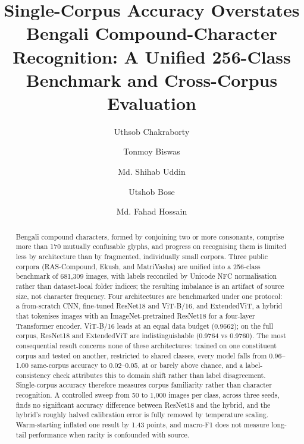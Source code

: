 \documentclass[5p,10pt]{elsarticle}
\begin{document}
\begin{frontmatter}

\title{Single-Corpus Accuracy Overstates Bengali Compound-Character Recognition: A Unified 256-Class Benchmark and Cross-Corpus Evaluation}

\author[inst1]{Uthsob Chakraborty}
\author[inst1]{Tonmoy Biswas}
\author[inst1]{Md. Shihab Uddin}
\author[inst2]{Utshob Bose}
\author[inst1]{Md. Fahad Hossain}

\address[inst1]{Department of Software Engineering, Daffodil International University, Dhaka, Bangladesh}
\address[inst2]{BRAC University, Dhaka, Bangladesh}

\begin{abstract}
Bengali compound characters, formed by conjoining two or more consonants, comprise more than 170 mutually confusable glyphs, and progress on recognising them is limited less by architecture than by fragmented, individually small corpora. Three public corpora (RAS-Compound, Ekush, and MatriVasha) are unified into a 256-class benchmark of 681,309 images, with labels reconciled by Unicode NFC normalisation rather than dataset-local folder indices; the resulting imbalance is an artifact of source size, not character frequency. Four architectures are benchmarked under one protocol: a from-scratch CNN, fine-tuned ResNet18 and ViT-B/16, and ExtendedViT, a hybrid that tokenises images with an ImageNet-pretrained ResNet18 for a four-layer Transformer encoder. ViT-B/16 leads at an equal data budget (0.9662); on the full corpus, ResNet18 and ExtendedViT are indistinguishable (0.9764 vs 0.9760). The most consequential result concerns none of these architectures: trained on one constituent corpus and tested on another, restricted to shared classes, every model falls from 0.96--1.00 same-corpus accuracy to 0.02--0.05, at or barely above chance, and a label-consistency check attributes this to domain shift rather than label disagreement. Single-corpus accuracy therefore measures corpus familiarity rather than character recognition. A controlled sweep from 50 to 1,000 images per class, across three seeds, finds no significant accuracy difference between ResNet18 and the hybrid, and the hybrid's roughly halved calibration error is fully removed by temperature scaling. Warm-starting inflated one result by 1.43 points, and macro-F1 does not measure long-tail performance when rarity is confounded with source.
\end{abstract}


\end{frontmatter}
\end{document}

